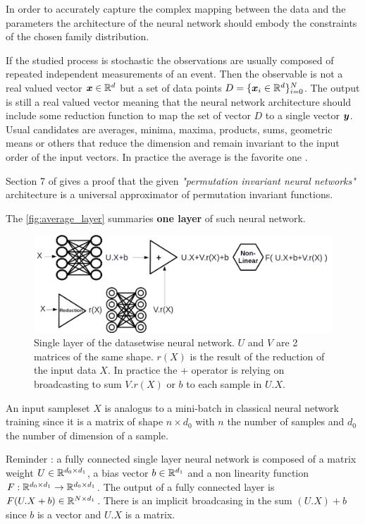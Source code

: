 In order to accurately capture the complex mapping between the data and the parameters the architecture of the neural network should embody the constraints of the chosen family distribution.

If the studied process is stochastic the observations are usually composed of repeated independent measurements of an event.
Then the observable is not a real valued vector ${\bm{x}} \in \mathbb{R}^d$ but a set of data points $D = \{{\bm{x}}_i \in \mathbb{R}^d \}_{i=0}^N$.
The output is still a real valued vector meaning that the neural network architecture should include some reduction function to map the set of vector $D$ to a single vector ${\bm{y}}$.
Usual candidates are averages, minima, maxima, products, sums, geometric means or others that reduce the dimension and remain invariant to the input order of the input vectors.
In practice the average is the favorite one \needcite.

Section 7 of \cite{lucas:hal-01791126} gives a proof that the given \emph{"permutation invariant neural networks"} architecture is a universal approximator of permutation invariant functions.

The \autoref{fig:average_layer} summaries \textbf{one layer} of such neural network.
\begin{figure}[htb]
    \includegraphics[width=\linewidth]{average_layer}
    \caption{Single layer of the datasetwise neural network. $U$ and $V$ are 2 matrices of the same shape. $r(X)$ is the result of the reduction of the input data $X$. In practice the + operator is relying on broadcasting to sum $V.r(X)$ or $b$ to each sample in $U.X$.}
    \label{fig:average_layer}
\end{figure}



An input sampleset $X$ is analogus to a mini-batch in classical neural network training since it is a matrix of shape $n \times d_0$ with $n$ the number of samples and $d_0$ the number of dimension of a sample.

Reminder : a fully connected single layer neural network is composed of a matrix weight $U \in \mathbb{R}^{d_0\times d_1}$, a bias vector $b \in \mathbb{R}^{d_1}$ and a non linearity function $F : \mathbb{R}^{d_0\times d_1} \to \mathbb{R}^{d_0\times d_1}$.
The output of a fully connected layer is $ F(U.X+b) \in \mathbb{R}^{N \times d_1}$.
There is an implicit broadcasing in the sum $(U.X)+b$ since $b$ is a vector and $U.X$ is a matrix.


